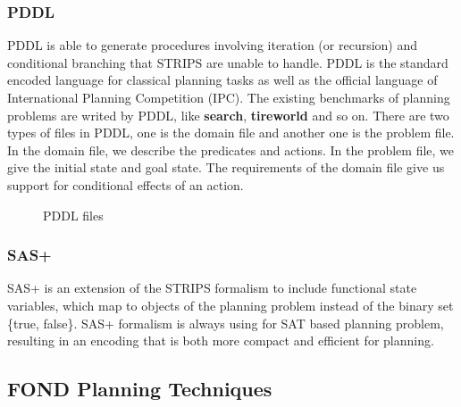 \documentclass[a4paper,12pt]{article}
\begin{document}
\subsubsection{PDDL}
PDDL is able to generate procedures involving iteration (or recursion) and conditional branching that STRIPS are unable to handle. PDDL is the standard encoded language for classical planning tasks as well as the official language of International Planning Competition (IPC)\cite{key12}. The existing benchmarks of planning problems are writed by PDDL, like \textbf{search}, \textbf{tireworld} and so on. There are two types of files in PDDL, one is the domain file and another one is the problem file. In the domain file, we describe the predicates and actions. In the problem file, we give the initial state and goal state. The requirements of the domain file give us support for conditional effects of an action.
\begin{figure}[H]
\centering  
{}
\caption{PDDL files}
\label{Fig.main}
\end{figure}
\subsubsection{ SAS+}
 SAS+ is an extension of the STRIPS formalism to include functional state variables, which map to objects of the planning problem instead of the binary set \{true, false\}\cite{key3}. SAS+ formalism is always using for SAT based planning problem, resulting in an encoding that is both more
compact and efficient for planning\cite{key16}.



\subsection{FOND Planning Techniques}
\end{document}
